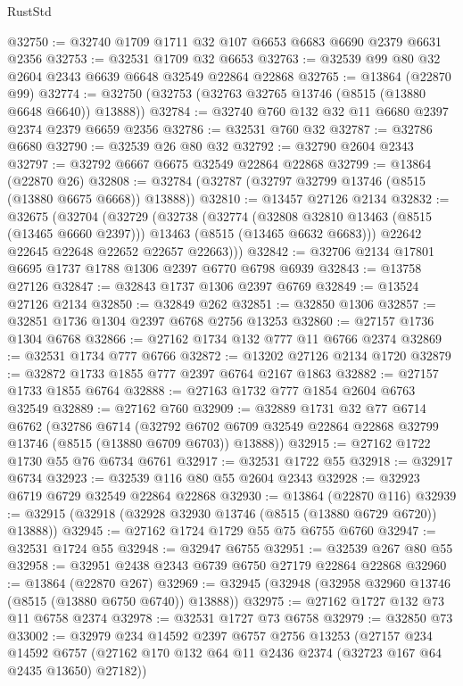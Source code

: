 \begin{lexlean}{RustStd}
\begin{coremodule}
@32750 := @32740 @1709 @1711 @32 @107 @6653 @6683 @6690 @2379 @6631 @2356
@32753 := @32531 @1709 @32 @6653
@32763 := @32539 @99 @80 @32 @2604 @2343 @6639 @6648 @32549 @22864 @22868
@32765 := @13864 (@22870 @99)
@32774 := @32750 (@32753 (@32763 @32765 @13746 (@8515 (@13880 @6648 @6640)) @13888))
@32784 := @32740 @760 @132 @32 @11 @6680 @2397 @2374 @2379 @6659 @2356
@32786 := @32531 @760 @32
@32787 := @32786 @6680
@32790 := @32539 @26 @80 @32
@32792 := @32790 @2604 @2343
@32797 := @32792 @6667 @6675 @32549 @22864 @22868
@32799 := @13864 (@22870 @26)
@32808 := @32784 (@32787 (@32797 @32799 @13746 (@8515 (@13880 @6675 @6668)) @13888))
@32810 := @13457 @27126 @2134
@32832 := @32675
    (@32704
      (@32729
        (@32738
          (@32774
            (@32808 @32810 @13463 (@8515 (@13465 @6660 @2397)))
            @13463
            (@8515 (@13465 @6632 @6683)))
          @22642
          @22645
          @22648
          @22652
          @22657
          @22663)))
@32842 := @32706 @2134 @17801 @6695 @1737 @1788 @1306 @2397 @6770 @6798 @6939
@32843 := @13758 @27126
@32847 := @32843 @1737 @1306 @2397 @6769
@32849 := @13524 @27126 @2134
@32850 := @32849 @262
@32851 := @32850 @1306
@32857 := @32851 @1736 @1304 @2397 @6768 @2756 @13253
@32860 := @27157 @1736 @1304 @6768
@32866 := @27162 @1734 @132 @777 @11 @6766 @2374
@32869 := @32531 @1734 @777 @6766
@32872 := @13202 @27126 @2134 @1720
@32879 := @32872 @1733 @1855 @777 @2397 @6764 @2167 @1863
@32882 := @27157 @1733 @1855 @6764
@32888 := @27163 @1732 @777 @1854 @2604 @6763 @32549
@32889 := @27162 @760
@32909 := @32889
    @1731
    @32
    @77
    @6714
    @6762
    (@32786
      @6714
      (@32792 @6702 @6709 @32549 @22864 @22868 @32799 @13746 (@8515 (@13880 @6709 @6703)) @13888))
@32915 := @27162 @1722 @1730 @55 @76 @6734 @6761
@32917 := @32531 @1722 @55
@32918 := @32917 @6734
@32923 := @32539 @116 @80 @55 @2604 @2343
@32928 := @32923 @6719 @6729 @32549 @22864 @22868
@32930 := @13864 (@22870 @116)
@32939 := @32915 (@32918 (@32928 @32930 @13746 (@8515 (@13880 @6729 @6720)) @13888))
@32945 := @27162 @1724 @1729 @55 @75 @6755 @6760
@32947 := @32531 @1724 @55
@32948 := @32947 @6755
@32951 := @32539 @267 @80 @55
@32958 := @32951 @2438 @2343 @6739 @6750 @27179 @22864 @22868
@32960 := @13864 (@22870 @267)
@32969 := @32945 (@32948 (@32958 @32960 @13746 (@8515 (@13880 @6750 @6740)) @13888))
@32975 := @27162 @1727 @132 @73 @11 @6758 @2374
@32978 := @32531 @1727 @73 @6758
@32979 := @32850 @73
@33002 := @32979
    @234
    @14592
    @2397
    @6757
    @2756
    @13253
    (@27157
      @234
      @14592
      @6757
      (@27162 @170 @132 @64 @11 @2436 @2374 (@32723 @167 @64 @2435 @13650) @27182))

\end{coremodule}
\end{lexlean}
